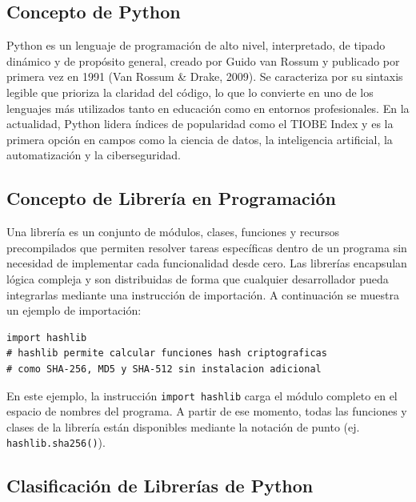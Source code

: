 \documentclass[12pt,a4paper]{article}
\begin{document}
\subsection{Concepto de Python}

Python es un lenguaje de programación de alto nivel, interpretado, de
tipado dinámico y de propósito general, creado por Guido van Rossum y
publicado por primera vez en 1991 (Van Rossum \& Drake, 2009). Se
caracteriza por su sintaxis legible que prioriza la claridad del código,
lo que lo convierte en uno de los lenguajes más utilizados tanto en
educación como en entornos profesionales. En la actualidad, Python
lidera índices de popularidad como el TIOBE Index y es la primera opción
en campos como la ciencia de datos, la inteligencia artificial, la
automatización y la ciberseguridad.

\subsection{Concepto de Librería en Programación}

Una librería es un conjunto de módulos, clases, funciones y recursos
precompilados que permiten resolver tareas específicas dentro de un
programa sin necesidad de implementar cada funcionalidad desde cero. Las
librerías encapsulan lógica compleja y son distribuidas de forma que
cualquier desarrollador pueda integrarlas mediante una instrucción de
importación. A continuación se muestra un ejemplo de importación:

\begin{lstlisting}[caption={Importación de la librería estándar hashlib en Python},
                   label=lst:import_hashlib]
import hashlib
# hashlib permite calcular funciones hash criptograficas
# como SHA-256, MD5 y SHA-512 sin instalacion adicional
\end{lstlisting}

En este ejemplo, la instrucción \texttt{import hashlib} carga el módulo
completo en el espacio de nombres del programa. A partir de ese momento,
todas las funciones y clases de la librería están disponibles mediante
la notación de punto (ej. \texttt{hashlib.sha256()}).

\subsection{Clasificación de Librerías de Python}
\end{document}
